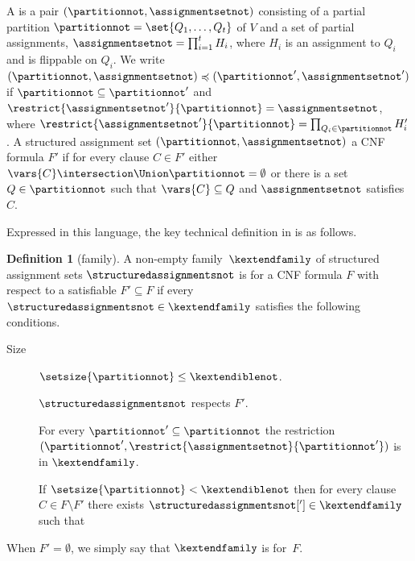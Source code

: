\documentclass[11pt]{article}
\numberwithin{equation}{section}
\theoremstyle{definition}
\newtheorem{definition}[theorem]{Definition}
\theoremstyle{plain}
\begin{document}
A  is a pair
$(\partitionnot, \assignmentsetnot)$ 
consisting of a partial partition $\partitionnot =
\set{Q_1, \ldots, Q_t}$ of $V$ and a set of 
partial assignments, %
$\assignmentsetnot = \prod_{i = 1}^t H_i$, where
%
%
$H_i$ is an assignment to $Q_i$ and is flippable on $Q_i$.  %
%
%
%
%
We write $(\partitionnot, \assignmentsetnot) \preccurlyeq
(\partitionnot', \assignmentsetnot')$ if $\partitionnot \subseteq \partitionnot'$
and $\restrict{\assignmentsetnot'}{\partitionnot} = \assignmentsetnot$, where
$\restrict{\assignmentsetnot'}{\partitionnot} = \prod_{Q_i \in \partitionnot} H'_i$. 
A structured assignment set $(\partitionnot, \assignmentsetnot)$
 a CNF formula $F'$ if for every clause $C \in
F'$ either $\vars{C}\intersection \Union \partitionnot=\emptyset$ or
there is a set $Q \in \partitionnot$ such that $\vars{C}\subseteq Q$ and
$\assignmentsetnot$ satisfies $C$.

Expressed in this language, the key technical definition in 
\cite{BG15Framework}
is as follows.

\begin{definition}[\KextendibleNok family]
  \label{def:k-extendible}
  A non-empty family~$\kextendfamily$ of structured assignment sets
  $\structuredassignmentsnot$ is \introduceterm{\kextendible{}} for a CNF
  formula $F$ with respect 
  to a satisfiable $F' \subseteq F$ 
%
%
%
  if every $\structuredassignmentsnot \in \kextendfamily$
  satisfies the following conditions.
  \begin{description}
  \item[Size]%
%
    $\setsize{\partitionnot} \leq \kextendiblenot$.
  \item[\Respectfulness{}]
%
    $\structuredassignmentsnot$ respects $F'$.
  \item[\Restrictionpropname{}] 
%
    For every $\partitionnot' \subseteq \partitionnot$ the restriction
    $(\partitionnot', \restrict{\assignmentsetnot}{\partitionnot'})$ is in
    $\kextendfamily$.
  \item[\Extensionpropname{}]
%
    If $\setsize{\partitionnot} < \kextendiblenot$ then for every
    clause $C \in F\setminus F'$ there exists
    $\structuredassignmentsnot['] \in \kextendfamily$ such that 
  \end{description}
%
  When $F' = \emptyset$, we simply say that $\kextendfamily$
    is \kextendible for~$F$.
%
%
%
%
%
%
%
%
%
%
%
%
%
%
%
%
%
%
%
%
%

\end{definition}
\end{document}

